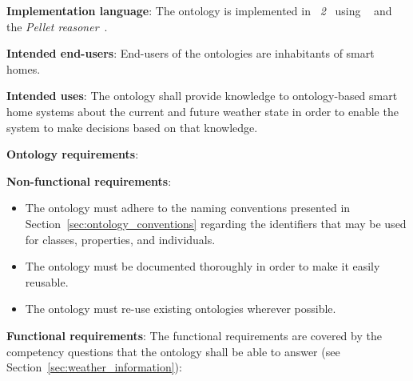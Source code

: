 \begin{mdframed}[linewidth=.6pt]
\vspace{.3cm}

\textbf{Implementation language}: The ontology is implemented in \emph{~2}~\cite{OWL} using \protege~\cite{protege} and the \emph{Pellet reasoner}~\cite{pellet}.

\vspace{.3cm}

\textbf{Intended end-users}: End-users of the ontologies are inhabitants of smart homes. %

\vspace{.3cm}

\textbf{Intended uses}: The ontology shall provide knowledge to ontology-based smart home systems about the current and future weather state in order to enable the system to make decisions based on that knowledge.

\vspace{.3cm}

\textbf{Ontology requirements}:

\vspace{.3cm}

\setlength{\leftskip}{.5cm}

\textbf{Non-functional requirements}:

\begin{itemize}
  \item The ontology must adhere to the naming conventions presented in Section~\ref{sec:ontology_conventions} regarding the identifiers that may be used for classes, properties, and individuals.
  \item The ontology must be documented thoroughly in order to make it easily reusable.
  \item The ontology must re-use existing ontologies wherever possible.
\end{itemize}

\textbf{Functional requirements}: The functional requirements are covered by the competency questions that the ontology shall be able to answer (see Section~\ref{sec:weather_information}):


\end{mdframed}
